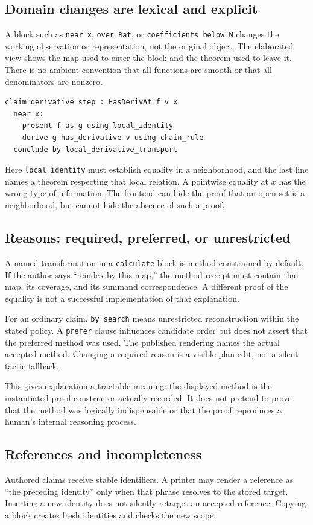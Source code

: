 \documentclass[11pt,a4paper]{article}
\newcommand{\code}[1]{\nolinkurl{#1}}
\theoremstyle{definition}
\begin{document}
\subsection{Domain changes are lexical and explicit}
A block such as \code{near x}, \code{over Rat}, or \code{coefficients below N}
changes the working observation or representation, not the original object.
The elaborated view shows the map used to enter the block and the theorem used
to leave it. There is no ambient convention that all functions are smooth or
that all denominators are nonzero.

\begin{lstlisting}
claim derivative_step : HasDerivAt f v x
  near x:
    present f as g using local_identity
    derive g has_derivative v using chain_rule
  conclude by local_derivative_transport
\end{lstlisting}

Here \code{local_identity} must establish equality in a neighborhood, and the
last line names a theorem respecting that local relation. A pointwise equality
at \(x\) has the wrong type of information. The frontend can hide the proof that
an open set is a neighborhood, but cannot hide the absence of such a proof.

\subsection{Reasons: required, preferred, or unrestricted}
A named transformation in a \code{calculate} block is method-constrained by
default. If the author says ``reindex by this map,'' the method receipt must
contain that map, its coverage, and its summand correspondence. A different
proof of the equality is not a successful implementation of that explanation.

For an ordinary claim, \code{by search} means unrestricted reconstruction within
the stated policy. A \code{prefer} clause influences candidate order but does
not assert that the preferred method was used. The published rendering names
the actual accepted method. Changing a required reason is a visible plan edit,
not a silent tactic fallback.

This gives explanation a tractable meaning: the displayed method is the
instantiated proof constructor actually recorded. It does not pretend to prove
that the method was logically indispensable or that the proof reproduces a
human's internal reasoning process.

\subsection{References and incompleteness}
Authored claims receive stable identifiers. A printer may render a reference as
``the preceding identity'' only when that phrase resolves to the stored target.
Inserting a new identity does not silently retarget an accepted reference.
Copying a block creates fresh identities and checks the new scope.
\end{document}
